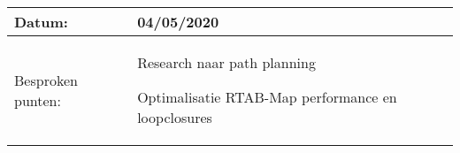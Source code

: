 \begin{tabularx}{\textwidth}{| l | X |}
  \hline
  Datum: & 04/05/2020\\
  \hline
  Besproken punten: &
  \begin{compactitem}
    \item Research naar path planning
    \item Optimalisatie RTAB-Map performance en loopclosures
  \end{compactitem}\\
  \hline
\end{tabularx}
